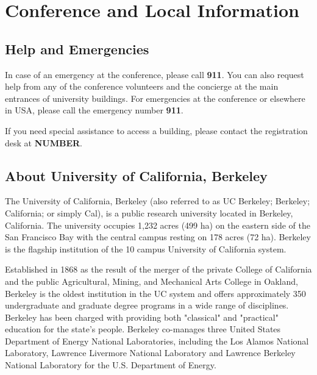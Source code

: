 \chapter{Conference and Local Information}

\setlength\fboxsep{0pt}
\setlength\fboxrule{0.5pt}
 \section{Help and Emergencies}

In case of an emergency at the conference, please call {\Large \textbf{911}}. You can also request help from any of the conference volunteers and the concierge at the main entrances of university buildings. For emergencies at the conference or elsewhere in USA, please call the emergency number {\Large \textbf{911}}. 

If you need special assistance to access a building, please contact the registration desk at {\Large \textbf{NUMBER}}.


 \section{About University of California, Berkeley}

The University of California, Berkeley (also referred to as UC Berkeley; Berkeley; California; or simply Cal), is a public research university located in Berkeley, California. The university occupies 1,232 acres (499 ha) on the eastern side of the San Francisco Bay with the central campus resting on 178 acres (72 ha). Berkeley is the flagship institution of the 10 campus University of California system.

Established in 1868 as the result of the merger of the private College of California and the public Agricultural, Mining, and Mechanical Arts College in Oakland, Berkeley is the oldest institution in the UC system and offers approximately 350 undergraduate and graduate degree programs in a wide range of disciplines. Berkeley has been charged with providing both "classical" and "practical" education for the state's people. Berkeley co-manages three United States Department of Energy National Laboratories, including the Los Alamos National Laboratory, Lawrence Livermore National Laboratory and Lawrence Berkeley National Laboratory for the U.S. Department of Energy.

